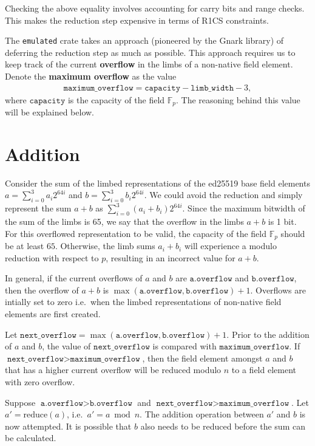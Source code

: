 \documentclass[a4paper, 12pt]{article}
\begin{document}
Checking the above equality involves accounting for carry bits and range checks. This makes the reduction step expensive in terms of R1CS constraints.

The \texttt{emulated} crate takes an approach (pioneered by the Gnark library) of deferring the reduction step as much as possible. This approach requires us to keep track of the current \textbf{overflow} in the limbs of a non-native field element. Denote the \textbf{maximum overflow} as the value 
\begin{align*}
\texttt{maximum\_overflow} = \texttt{capacity} - \texttt{limb\_width} - 3,
\end{align*}
where $\texttt{capacity}$ is the capacity of the field $\mathbb{F}_p$. The reasoning behind this value will be explained below.

\section{Addition}%
\label{sec:addition}

Consider the sum of the limbed representations of the ed25519 base field elements $a = \sum_{i=0}^3 a_i 2^{64i}$ and $b = \sum_{i=0}^3 b_i 2^{64i}$. We could avoid the reduction and simply represent the sum $a+b$ as $\sum_{i=0}^3 (a_i + b_i) 2^{64i}$. Since the maximum bitwidth of the sum of the limbs is 65, we say that the overflow in the limbs $a+b$ is 1 bit. For this overflowed representation to be valid, the capacity of the field $\mathbb{F}_p$ should be at least $65$. Otherwise, the limb sums $a_i + b_i$ will experience a modulo reduction with respect to $p$, resulting in an incorrect value for $a+b$.

In general, if the current overflows of $a$ and $b$ are $\texttt{a.overflow}$ and $\texttt{b.overflow}$, then the overflow of $a+b$ is $\max(\texttt{a.overflow}, \texttt{b.overflow}) + 1$. Overflows are intially set to zero i.e.~when the limbed representations of non-native field elements are first created.

Let $\texttt{next\_overflow} = \max(\texttt{a.overflow}, \texttt{b.overflow}) + 1$. Prior to the addition of $a$ and $b$, the value of $\texttt{next\_overflow}$ is compared with $\texttt{maximum\_overflow}$. If $\texttt{next\_overflow} > \texttt{maximum\_overflow}$, then the field element amongst $a$ and $b$ that has a higher current overflow will be reduced modulo $n$ to a field element with zero overflow. 

Suppose $\texttt{a.overflow} > \texttt{b.overflow}$ and $\texttt{next\_overflow} > \texttt{maximum\_overflow}$. Let $a' = \text{reduce}(a)$, i.e.~$a' = a \bmod n$. The addition operation between $a'$ and $b$ is now attempted. It is possible that $b$ also needs to be reduced before the sum can be calculated.
\end{document}
